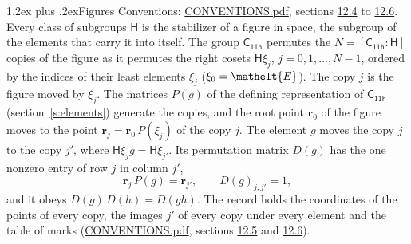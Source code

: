 \documentclass[10pt,a4paper]{article}
\makeatletter
\renewcommand\section{\@startsection{section}{1}{\z@}{-3ex plus -1ex minus -.2ex}%
  {1.2ex plus .2ex}{\normalfont\large\sffamily\bfseries\color{parttitle}}}
\numberwithin{equation}{section}
\newcommand{\eltfont}[1]{{\let\sigma\eltsigma\mathelt{#1}}}
\newcommand{\grp}[1]{\mathsf{#1}}
\newcommand{\cls}[1]{\eltfont{#1}}
\newcommand{\pointr}{\mathbf{r}}
\makeatother
\begin{document}
\section{Figures}\label{s:permutation}
Conventions: \href{../../CONVENTIONS.pdf}{CONVENTIONS.pdf}, sections \href{../../CONVENTIONS.pdf\#conv.12.4}{12.4} to \href{../../CONVENTIONS.pdf\#conv.12.6}{12.6}.
Every class of subgroups $\grp{H}$ is the stabilizer of a figure in space, the subgroup of the elements that carry it into itself. \label{n:local.orbit.size}\label{n:element.coset.least}\label{n:index.coset}The group $\grp{C_{11h}}$ permutes the $N = [\grp{C_{11h}} : \grp{H}]$ copies of the figure as it permutes the right cosets $\grp{H}\xi_j$, $j = 0, 1, \dots, N - 1$, ordered by the indices of their least elements $\xi_j$ ($\xi_0 = \cls{E}$). The copy $j$ is the figure moved by $\xi_j$. The matrices $P(g)$ of the defining representation of $\grp{C_{11h}}$ (section~\ref{s:elements}) generate the copies, and the root point $\pointr_0$ of the figure moves to the point $\pointr_j = \pointr_0\, P(\xi_j)$ of the copy $j$. \label{n:local.coset.image}The element $g$ moves the copy $j$ to the copy $j'$, where $\grp{H}\xi_j g = \grp{H}\xi_{j'}$. \label{n:local.matrix.permutation}Its permutation matrix $D(g)$ has the one nonzero entry of row $j$ in column $j'$,
\begin{equation}\label{e:perm.matrix}\pointr_j\, P(g) = \pointr_{j'}, \qquad D(g)_{j,j'} = 1,\end{equation}
and it obeys $D(g)\, D(h) = D(gh)$. The record holds the coordinates of the points of every copy, the images $j'$ of every copy under every element and the table of marks (\href{../../CONVENTIONS.pdf}{CONVENTIONS.pdf}, sections \href{../../CONVENTIONS.pdf\#conv.12.5}{12.5} and \href{../../CONVENTIONS.pdf\#conv.12.6}{12.6}).
\end{document}
